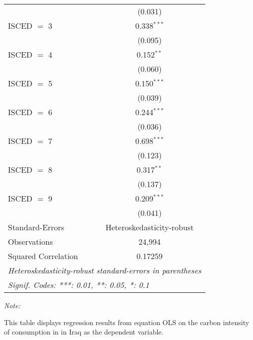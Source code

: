\begin{table}[htbp!]
\begin{adjustbox}{width = 1\textwidth, max height = 0.95\textheight, center}
\begin{threeparttable}[b]
\begin{tabular}{lc}
                                & (0.031)\\   
            ISCED $=$ 3         & 0.338$^{***}$\\   
                                & (0.095)\\   
            ISCED $=$ 4         & 0.152$^{**}$\\   
                                & (0.060)\\   
            ISCED $=$ 5         & 0.150$^{***}$\\   
                                & (0.039)\\   
            ISCED $=$ 6         & 0.244$^{***}$\\   
                                & (0.036)\\   
            ISCED $=$ 7         & 0.698$^{***}$\\   
                                & (0.123)\\   
            ISCED $=$ 8         & 0.317$^{**}$\\   
                                & (0.137)\\   
            ISCED $=$ 9         & 0.209$^{***}$\\   
                                & (0.041)\\   
            \midrule 
            Standard-Errors     & Heteroskedasticity-robust \\   
            Observations        & 24,994\\  
            Squared Correlation & 0.17259\\  
            \midrule \midrule
            \multicolumn{2}{l}{\emph{Heteroskedasticity-robust standard-errors in parentheses}}\\
            \multicolumn{2}{l}{\emph{Signif. Codes: ***: 0.01, **: 0.05, *: 0.1}}\\
         \end{tabular}
         
         \begin{tablenotes}\item \medskip \textit{Note:}
            \item This table displays regression results from equation OLS on the carbon intensity of consumption in  in Iraq as the dependent variable. 
         \end{tablenotes}
      \end{threeparttable}
   \end{adjustbox}
\end{table}


